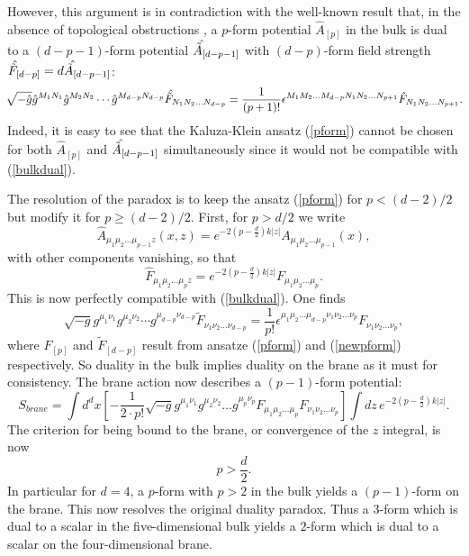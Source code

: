 \documentclass[a4paper,12pt]{article}
\begin{document}
However, this argument is in contradiction with the well-known result
that, in the absence of topological obstructions \cite{DuffvanN}, a
$p$-form potential $\hat A_{[p]}$ in the bulk is dual to a $(d-p-1)$-form
potential $\kern4pt\hat{\kern-4pt\tilde A}_{[d-p-1]}$ with $(d-p)$-form
field strength $\kern2pt\hat{\kern-2pt\tilde F}_{[d-p]}=d
\kern4pt\hat{\kern-4pt\tilde A}_{[d-p-1]}$:
%
\begin{equation}
\kern-2pt
\sqrt{-\hat g} \hat g^{M_{1}N_{1}} \hat g^{M_{2}N_{2}}\cdots
\hat g^{M_{d-p}N_{d-p}}
\kern2pt\hat{\kern-2pt\tilde F}_{N_{1}N_{2}\ldots N_{d-p}}=
\frac{1}{(p+1)!}\epsilon^{M_{1}M_{2}\ldots M_{d-p} N_{1}N_{2}\ldots N_{p+1}}
\hat F_{N_{1}N_{2}\ldots N_{p+1}}.
\kern-3pt
\label{bulkdual}
\end{equation}
%
Indeed, it is easy to see that the Kaluza-Klein ansatz (\ref{pform})
cannot be chosen for both $\hat A_{[p]}$ and
$\kern4pt\hat{\kern-4pt\tilde A}_{[d-p-1]}$
simultaneously since it would not be compatible with (\ref{bulkdual}).

The resolution of the paradox is to keep the ansatz (\ref{pform}) for
$p<(d-2)/2$ but modify it for $p \geq (d-2)/2$. First, for $p>d/2$ we write
%
\begin{equation}
\hat A_{\mu_{1}\mu_{2}\ldots \mu_{p-1} z}(x,z)=
e^{-2\left(p-\frac{d}{2}\right) k|z|}A_{\mu_{1}\mu_{2}\ldots\mu_{p-1}}(x),
\label{newpform}
\end{equation}
%
with other components vanishing, so that
%
\begin{equation}
\hat F_{\mu_{1}\mu_{2}\ldots \mu_{p} z}=e^{-2\left(p-\frac{d}{2}\right)k|z|}
F_{\mu_{1}\mu_{2}\ldots \mu_{p}}.
\end{equation}
%
This is now perfectly compatible with (\ref{bulkdual}). One finds
%
\begin{equation}
\sqrt{-g} g^{\mu_{1}\nu_{1}} g^{\mu_{2}\nu_{2}}\cdots g^{\mu_{d-p}\nu_{d-p}}
{\tilde F}_{\nu_{1}\nu_{2} \ldots \nu_{d-p}}=
\frac{1}{p!}\epsilon^{\mu_{1}\mu_{2} \ldots \mu_{d-p} \nu_{1}\nu_{2}
\ldots \nu_{p} }
F_{\nu_{1} \nu_{2} \ldots \nu_{p}},
\label{branedual}
\end{equation}
%
where $F_{[p]}$ and $\tilde F_{[d-p]}$ result from ansatze (\ref{pform})
and (\ref{newpform}) respectively.
So duality in the bulk implies duality on the brane as it must for
consistency. The brane action now describes a $(p-1)$-form potential:
%
\begin{equation}
S_{brane}=\int d^{d}x
\left[-\frac{1}{2\cdot p!}\sqrt{-g}g^{\mu_{1}\nu_{1}}g^{\mu_{2}\nu_{2}}\ldots
g^{\mu_{p}\nu_{p}}
F_{\mu_{1}\mu_{2}\ldots \mu_{p}}F_{\nu_{1}\nu_{2} \ldots \nu_{p}}\right]
\int dz\, e^{-2\left(p-\frac{d}{2}\right) k|z|}.
\label{newbraneaction}
\end{equation}
%
The criterion for being bound to the brane, or convergence of the $z$
integral, is now
%
\begin{equation}
p>\frac{d}{2}.
\label{newconverge}
\end{equation}
%
In particular for $d=4$, a $p$-form with $p>2$ in the bulk yields a
$(p-1)$-form on the brane. This now resolves the original
duality paradox. Thus a $3$-form which is dual to a scalar in
the five-dimensional bulk yields a $2$-form which is dual to a scalar
on the four-dimensional brane.
\end{document}
